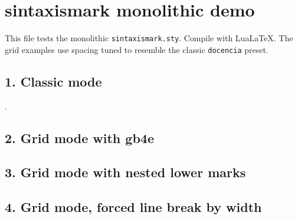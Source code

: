 \documentclass{article}
\begin{document}
\section*{sintaxismark monolithic demo}

This file tests the monolithic \texttt{sintaxismark.sty}.  Compile with
LuaLaTeX.  The grid examples use spacing tuned to resemble the classic
\texttt{docencia} preset.

\subsection*{1. Classic mode}

\begin{exe}
\ex {} .
\end{exe}

\subsection*{2. Grid mode with gb4e}

\begin{exe}
\ex
\begin{sintaxisgrid}[width=.92\linewidth,valign=base,yoffset=0pt]
\end{sintaxisgrid}
\end{exe}

\subsection*{3. Grid mode with nested lower marks}

\begin{exe}
\ex
\begin{sintaxisgrid}[width=.92\linewidth,valign=base,yoffset=0pt]
\end{sintaxisgrid}
\end{exe}

\subsection*{4. Grid mode, forced line break by width}

\begin{exe}
\ex
\begin{sintaxisgrid}[width=8cm,valign=base,yoffset=0pt]
\end{sintaxisgrid}
\end{exe}
\end{document}

